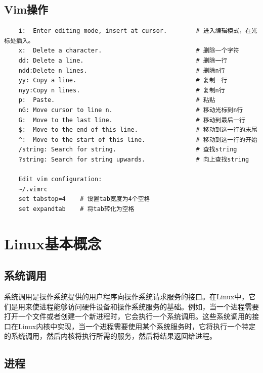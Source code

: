 \documentclass[12pt, a4paper, oneside]{ctexbook}
\numberwithin{figure}{section}
\begin{document}
\subsection{Vim操作}
\begin{verbatim}
    i:  Enter editing mode, insert at cursor.        # 进入编辑模式，在光标处插入。
    x:  Delete a character.                          # 删除一个字符
    dd: Delete a line.                               # 删除一行
    ndd:Delete n lines.                              # 删除n行
    yy: Copy a line.                                 # 复制一行
    nyy:Copy n lines.                                # 复制n行
    p:  Paste.                                       # 粘贴
    nG: Move cursor to line n.                       # 移动光标到n行
    G:  Move to the last line.                       # 移动到最后一行
    $:  Move to the end of this line.                # 移动到这一行的末尾
    ^:  Move to the start of this line.              # 移动到这一行的开始
    /string: Search for string.                      # 查找string
    ?string: Search for string upwards.              # 向上查找string
    
    Edit vim configuration:
    ~/.vimrc
    set tabstop=4    # 设置tab宽度为4个空格
    set expandtab    # 将tab转化为空格
    \end{verbatim}
\section{Linux基本概念}

\subsection{系统调用}
    
系统调用是操作系统提供的用户程序向操作系统请求服务的接口。在Linux中，它们是用来使进程能够访问硬件设备和操作系统服务的基础。例如，当一个进程需要打开一个文件或者创建一个新进程时，它会执行一个系统调用。这些系统调用的接口在Linux内核中实现，当一个进程需要使用某个系统服务时，它将执行一个特定的系统调用，然后内核将执行所需的服务，然后将结果返回给进程。

\subsection{进程}
    
\end{document}
